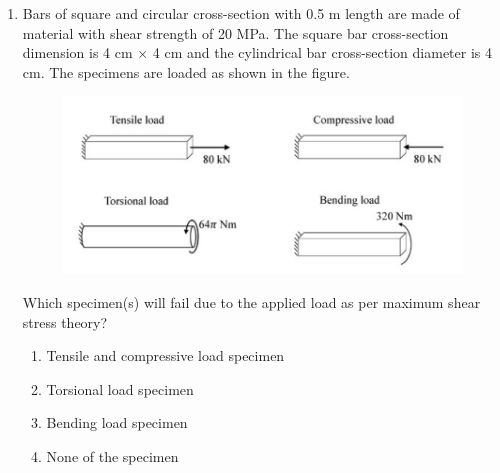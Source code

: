 \documentclass[12pt,onecolumn]{article}
\begin{document}
\begin{enumerate}
    \item Bars of square and circular cross-section with 0.5 m length are made of material with shear strength of 20 MPa. The square bar cross-section dimension is 4 cm $\times$ 4 cm and the cylindrical bar cross-section diameter is 4 cm. The specimens are loaded as shown in the figure.
          \begin{figure}[H]
              \centering
              \includegraphics[scale=0.4]{q28}
              \label{fig:q28}
          \end{figure}
          Which specimen(s) will fail due to the applied load as per maximum shear stress theory?
          \begin{enumerate}
              \item Tensile and compressive load specimen
              \item Torsional load specimen
              \item Bending load specimen
              \item None of the specimen
          \end{enumerate}


\end{enumerate}
\end{document}
